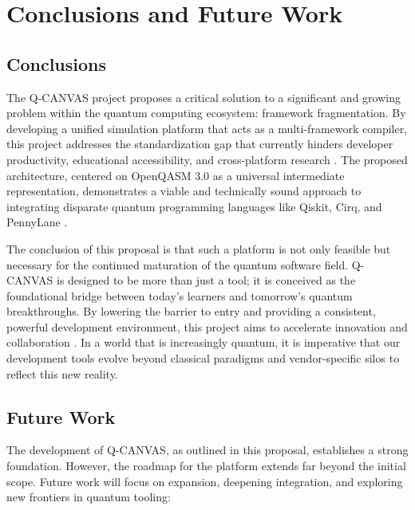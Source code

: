 \chapter{Conclusions and Future Work}

\section{Conclusions}
The Q-CANVAS project proposes a critical solution to a significant and growing problem within the quantum computing ecosystem: framework fragmentation. By developing a unified simulation platform that acts as a multi-framework compiler, this project addresses the standardization gap that currently hinders developer productivity, educational accessibility, and cross-platform research \cite{exp2017, pycqed2021}. The proposed architecture, centered on OpenQASM 3.0 as a universal intermediate representation, demonstrates a viable and technically sound approach to integrating disparate quantum programming languages like Qiskit, Cirq, and PennyLane \cite{mckay2018}.

The conclusion of this proposal is that such a platform is not only feasible but necessary for the continued maturation of the quantum software field. Q-CANVAS is designed to be more than just a tool; it is conceived as the foundational bridge between today's learners and tomorrow's quantum breakthroughs. By lowering the barrier to entry and providing a consistent, powerful development environment, this project aims to accelerate innovation and collaboration \cite{peruzzo2014}. In a world that is increasingly quantum, it is imperative that our development tools evolve beyond classical paradigms and vendor-specific silos to reflect this new reality.

\section{Future Work}
The development of Q-CANVAS, as outlined in this proposal, establishes a strong foundation. However, the roadmap for the platform extends far beyond the initial scope. Future work will focus on expansion, deepening integration, and exploring new frontiers in quantum tooling:

